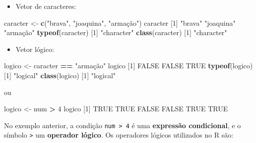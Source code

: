 \documentclass[10pt,a4paper]{book}
\newenvironment{Shaded}{\begin{snugshade}}{\end{snugshade}}
\newcommand{\KeywordTok}[1]{\textcolor[rgb]{0.13,0.29,0.53}{\textbf{#1}}}
\newcommand{\DecValTok}[1]{\textcolor[rgb]{0.00,0.00,0.81}{#1}}
\newcommand{\StringTok}[1]{\textcolor[rgb]{0.31,0.60,0.02}{#1}}
\newcommand{\OtherTok}[1]{\textcolor[rgb]{0.56,0.35,0.01}{#1}}
\newcommand{\OperatorTok}[1]{\textcolor[rgb]{0.81,0.36,0.00}{\textbf{#1}}}
\newcommand{\NormalTok}[1]{#1}
\providecommand{\tightlist}{%
  \setlength{\itemsep}{0pt}\setlength{\parskip}{0pt}}
\begin{document}
\begin{itemize}
\tightlist
\item
  Vetor de caracteres:
\end{itemize}

\begin{Shaded}
\begin{Highlighting}[]
\NormalTok{caracter <-}\StringTok{ }\KeywordTok{c}\NormalTok{(}\StringTok{"brava"}\NormalTok{, }\StringTok{"joaquina"}\NormalTok{, }\StringTok{"armação"}\NormalTok{)}
\NormalTok{caracter}
\NormalTok{[}\DecValTok{1}\NormalTok{] }\StringTok{"brava"}    \StringTok{"joaquina"} \StringTok{"armação"} 
\KeywordTok{typeof}\NormalTok{(caracter)}
\NormalTok{[}\DecValTok{1}\NormalTok{] }\StringTok{"character"}
\KeywordTok{class}\NormalTok{(caracter)}
\NormalTok{[}\DecValTok{1}\NormalTok{] }\StringTok{"character"}
\end{Highlighting}
\end{Shaded}

\begin{itemize}
\tightlist
\item
  Vetor lógico:
\end{itemize}

\begin{Shaded}
\begin{Highlighting}[]
\NormalTok{logico <-}\StringTok{ }\NormalTok{caracter }\OperatorTok{==}\StringTok{ "armação"}
\NormalTok{logico}
\NormalTok{[}\DecValTok{1}\NormalTok{] }\OtherTok{FALSE} \OtherTok{FALSE}  \OtherTok{TRUE}
\KeywordTok{typeof}\NormalTok{(logico)}
\NormalTok{[}\DecValTok{1}\NormalTok{] }\StringTok{"logical"}
\KeywordTok{class}\NormalTok{(logico)}
\NormalTok{[}\DecValTok{1}\NormalTok{] }\StringTok{"logical"}
\end{Highlighting}
\end{Shaded}

ou

\begin{Shaded}
\begin{Highlighting}[]
\NormalTok{logico <-}\StringTok{ }\NormalTok{num }\OperatorTok{>}\StringTok{ }\DecValTok{4}
\NormalTok{logico}
\NormalTok{[}\DecValTok{1}\NormalTok{]  }\OtherTok{TRUE}  \OtherTok{TRUE} \OtherTok{FALSE} \OtherTok{FALSE}  \OtherTok{TRUE}  \OtherTok{TRUE}
\end{Highlighting}
\end{Shaded}

No exemplo anterior, a condição \texttt{num\ \textgreater{}\ 4} é uma
\textbf{expressão condicional}, e o símbolo \texttt{\textgreater{}} um
\textbf{operador lógico}. Os operadores lógicos utilizados no R são:
\end{document}
